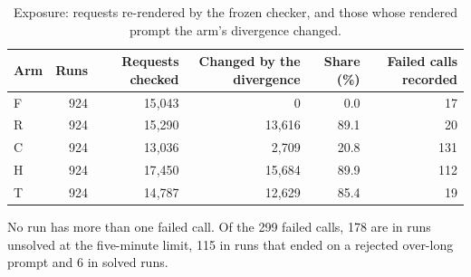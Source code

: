 \begin{table}[!htb]
\centering
\caption{Exposure: requests re-rendered by the frozen checker, and those whose rendered prompt the arm's divergence changed.}\label{tab:s-exposure}
\footnotesize
\begin{tabular}{lrrrrr}
\toprule
Arm & Runs & Requests checked & Changed by the divergence & Share (\%) & Failed calls recorded \\
\midrule
F & 924 & 15{,}043 & 0 & 0.0 & 17 \\
R & 924 & 15{,}290 & 13{,}616 & 89.1 & 20 \\
C & 924 & 13{,}036 & 2{,}709 & 20.8 & 131 \\
H & 924 & 17{,}450 & 15{,}684 & 89.9 & 112 \\
T & 924 & 14{,}787 & 12{,}629 & 85.4 & 19 \\
\bottomrule
\end{tabular}

\par\smallskip\parbox{0.96\linewidth}{\footnotesize No run has more than one failed call. Of the 299 failed calls, 178 are in runs unsolved at the five-minute limit, 115 in runs that ended on a rejected over-long prompt and 6 in solved runs.}
\end{table}
